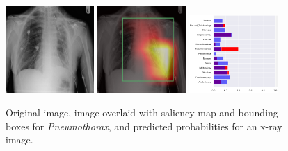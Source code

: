 \documentclass[8pt]{beamer}
\begin{document}
\begin{frame}
\begin{figure}[H]
  \centering
  \includegraphics[width=0.3\textwidth]{images/preds/pneumothorax}\hspace{0.01\textwidth}%
  \includegraphics[width=0.3\textwidth]{images/preds/pneumothorax_cam}\hspace{0.01\textwidth}%
  \includegraphics[width=0.3\textwidth]{images/preds/pneumothorax_probs}\\[0.01\textwidth]
  \caption{Original image, image overlaid with saliency map and bounding boxes
    for \emph{Pneumothorax}, and predicted probabilities for an x-ray image.}
  \label{examples_8}
\end{figure}
\end{frame}
\end{document}
